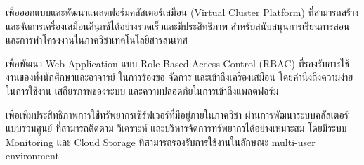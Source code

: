 \begin{mycustomenum}[label=1.2.\arabic*] %
    \item เพื่อออกแบบและพัฒนาแพลตฟอร์มคลัสเตอร์เสมือน (Virtual Cluster Platform) ที่สามารถสร้างและจัดการเครื่องเสมือนลีนุกซ์ได้อย่างรวดเร็วและมีประสิทธิภาพ สำหรับสนับสนุนการเรียนการสอนและการทำโครงงานในภาควิชาเทคโนโลยีสารสนเทศ
    \item เพื่อพัฒนา Web Application แบบ Role-Based Access Control (RBAC) ที่รองรับการใช้งานของทั้งนักศึกษาและอาจารย์ ในการร้องขอ จัดการ และเข้าถึงเครื่องเสมือน โดยคำนึงถึงความง่ายในการใช้งาน เสถียรภาพของระบบ และความปลอดภัยในการเข้าถึงแพลตฟอร์ม
    \newpage
    \item เพื่อเพิ่มประสิทธิภาพการใช้ทรัพยากรเซิร์ฟเวอร์ที่มีอยู่ภายในภาควิชา ผ่านการพัฒนาระบบคลัสเตอร์แบบรวมศูนย์ ที่สามารถติดตาม วิเคราะห์ และบริหารจัดการทรัพยากรได้อย่างเหมาะสม โดยมีระบบ Monitoring และ Cloud Storage ที่สามารถรองรับการใช้งานในลักษณะ multi-user environment
\end{mycustomenum}



